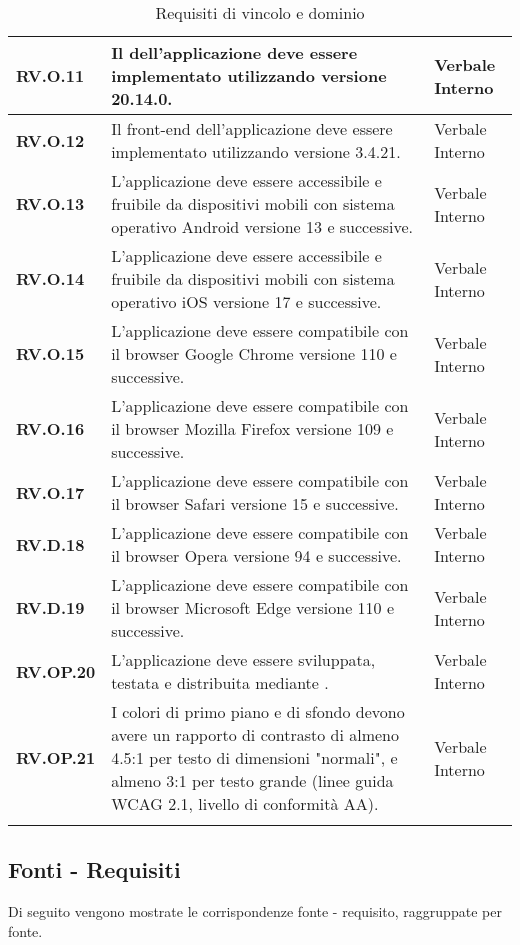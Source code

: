 \begin{longtable}{|P{3cm}|P{6,5cm}|>{\arraybackslash}P{4cm}|}
  \hline
  \textbf{RV.O.11} & Il  dell'applicazione deve essere implementato utilizzando  versione 20.14.0. & Verbale Interno \\
  \hline
  \textbf{RV.O.12} & Il front-end dell'applicazione deve essere implementato utilizzando  versione 3.4.21. & Verbale Interno \\
  \hline
  \textbf{RV.O.13} & L'applicazione deve essere accessibile e fruibile da dispositivi mobili con sistema operativo Android versione 13 e successive. & Verbale Interno \\
  \hline
  \textbf{RV.O.14} & L'applicazione deve essere accessibile e fruibile da dispositivi mobili con sistema operativo iOS versione 17 e successive. & Verbale Interno \\
  \hline
  \textbf{RV.O.15} & L'applicazione deve essere compatibile con il browser Google Chrome versione 110 e successive. & Verbale Interno \\
  \hline
  \textbf{RV.O.16} & L'applicazione deve essere compatibile con il browser Mozilla Firefox versione 109 e successive. & Verbale Interno \\
  \hline
  \textbf{RV.O.17} & L'applicazione deve essere compatibile con il browser Safari versione 15 e successive. & Verbale Interno \\
  \hline
  \textbf{RV.D.18} & L'applicazione deve essere compatibile con il browser Opera versione 94 e successive. & Verbale Interno \\
  \hline
  \textbf{RV.D.19} & L'applicazione deve essere compatibile con il browser Microsoft Edge versione 110 e successive. & Verbale Interno \\
  \hline
  \textbf{RV.OP.20} & L'applicazione deve essere sviluppata, testata e distribuita mediante . & Verbale Interno \\
  \hline
  \textbf{RV.OP.21} & I colori di primo piano e di sfondo devono avere un rapporto di contrasto di almeno 4.5:1 per testo di dimensioni "normali", e almeno 3:1 per testo grande (linee guida WCAG 2.1, livello di conformità AA). & Verbale Interno \\
  \hline
\caption{Requisiti di vincolo e dominio}
\label{requisitivincolo}
\end{longtable}

\subsection{Fonti - Requisiti}
Di seguito vengono mostrate le corrispondenze fonte - requisito, raggruppate per fonte.

